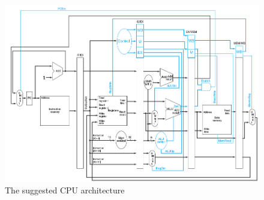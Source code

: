 
\begin{figure}[ht]
    \centering
    \includegraphics[width=\textwidth]{figures/SuggestedArchitecture.png}
    \caption{The suggested CPU architecture} 
    \label{fig:suggestedArchitecture}
\end{figure}

